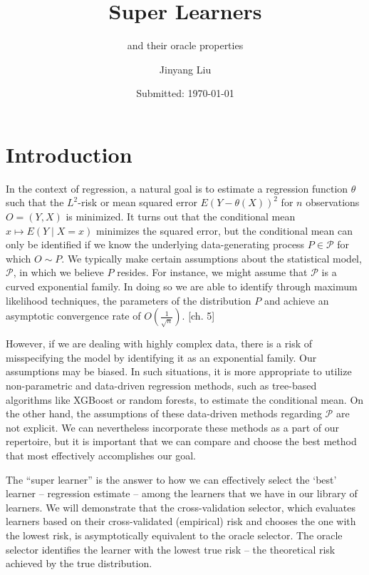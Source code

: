 \documentclass[11pt, a4paper]{article}
\author{Jinyang Liu}
\title{Super Learners}
\subtitle{and their oracle properties}
\date{Submitted: \today}
\theoremstyle{definition}
\theoremstyle{remark}
\begin{document}
\begingroup
    \selectfont
    \maketitle
    \tableofcontents
    \newpage
\endgroup


\section{Introduction}
In the context of regression, a natural goal is to estimate a regression function $ \theta $ such that the $ L^2 $-risk or mean squared error $ E(Y - \theta(X))^2 $ for $ n $ observations $ O = (Y, X) $ is minimized. It turns out that the conditional mean $ x \mapsto E(Y \mid X = x) $ minimizes the squared error, but the conditional mean can only be identified if we know the underlying data-generating process $ P \in \mathcal{P} $ for which $ O \sim P $. We typically make certain assumptions about the statistical model, $\mathcal{P}$, in which we believe $P$ resides. For instance, we might assume that $\mathcal{P}$ is a curved exponential family. In doing so we are able to identify through maximum likelihood techniques, the parameters of the distribution $ P $ and achieve an asymptotic convergence rate of $ O\left(\frac{1}{\sqrt{n}}\right) $. \parencite{lauritzen2022statistics}[ch. 5]

However, if we are dealing with highly complex data, there is a risk of misspecifying the model by identifying it as an exponential family. Our assumptions may be biased. In such situations, it is more appropriate to utilize non-parametric and data-driven regression methods, such as tree-based algorithms like XGBoost or random forests, to estimate the conditional mean. On the other hand, the assumptions of these data-driven methods regarding $ \mathcal{P} $ are not explicit. We can nevertheless incorporate these methods as a part of our repertoire, but it is important that we can compare and choose the best method that most effectively accomplishes our goal. 

The ``super learner'' is the answer to how we can effectively select the `best' learner -- regression estimate -- among the learners that we have in our library of learners. We will demonstrate that the cross-validation selector, which evaluates learners based on their cross-validated (empirical) risk and chooses the one with the lowest risk, is asymptotically equivalent to the oracle selector. The oracle selector identifies the learner with the lowest true risk – the theoretical risk achieved by the true distribution.
\end{document}
